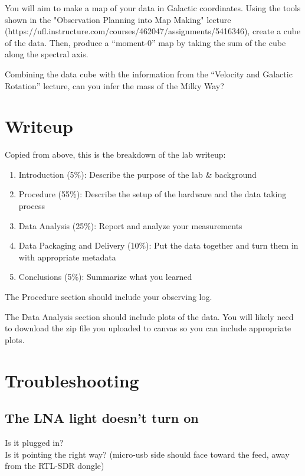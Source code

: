 \documentclass[11pt]{article}
\begin{document}
You will aim to make a map of your data in Galactic coordinates.
Using the tools shown in the "Observation Planning into Map Making" lecture
(https://ufl.instructure.com/courses/462047/assignments/5416346),
create a cube of the data.
Then, produce a ``moment-0'' map by taking the sum of the cube along the spectral
axis.

Combining the data cube with the information from the ``Velocity and Galactic
Rotation'' lecture, can you infer the mass of the Milky Way?


\section{Writeup}

Copied from above, this is the breakdown of the lab writeup:
\begin{enumerate}
    \item Introduction (5\%): Describe the purpose of the lab \& background
    \item Procedure (55\%): Describe the setup of the hardware and the data taking process
    \item Data Analysis (25\%):  Report and analyze your measurements
    \item Data Packaging and Delivery (10\%): Put the data together and turn them in with appropriate metadata
    \item Conclusions (5\%): Summarize what you learned
\end{enumerate}


The Procedure section should include your observing log.

The Data Analysis section should include plots of the data.
You will likely need to download the zip file you uploaded to canvas
so you can include appropriate plots.






\section{Troubleshooting}
\label{sec:troubleshooting}
\subsection{The LNA light doesn't turn on}

Is it plugged in?\\

Is it pointing the right way?  (micro-usb side should face toward the feed, away from the RTL-SDR dongle)\\
\end{document}
